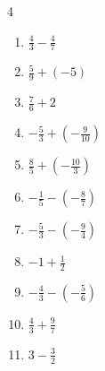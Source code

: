 \begin{multicols}{4}
\begin{enumerate}

  \item $\displaystyle \frac{4}{3} - \frac{4}{7}$


  \item $\displaystyle \frac{5}{9} + \left(-5\right)$


  \item $\displaystyle \frac{7}{6} + 2$


  \item $\displaystyle -\frac{5}{3} + \left(-\frac{9}{10}\right)$


  \item $\displaystyle \frac{8}{5} + \left(-\frac{10}{3}\right)$


  \item $\displaystyle -\frac{1}{5} - \left(-\frac{8}{7}\right)$


\columnbreak %

  \item $\displaystyle -\frac{5}{3} - \left(-\frac{9}{4}\right)$


  \item $\displaystyle -1 + \frac{1}{2}$


  \item $\displaystyle -\frac{4}{3} - \left(-\frac{5}{6}\right)$


  \item $\displaystyle \frac{4}{3} + \frac{9}{7}$


  \item $\displaystyle 3 - \frac{3}{2}$



\end{enumerate}
\end{multicols}
